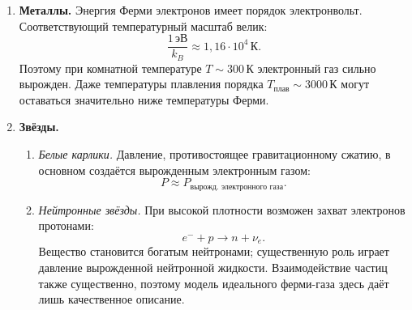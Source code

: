 \documentclass[../final.tex]{subfiles}
\begin{document}
\begin{enumerate}
    \item \textbf{Металлы.}
    Энергия Ферми электронов имеет порядок электронвольт.
    Соответствующий температурный масштаб велик:
    \begin{equation*}
        \frac{1\,\text{эВ}}{k_B}
        \approx 1{,}16\cdot 10^4\,\text{К}.
    \end{equation*}
    Поэтому при комнатной температуре $T\sim 300\,\text{К}$
    электронный газ сильно вырожден. Даже температуры плавления
    порядка $T_{\text{плав}}\sim 3000\,\text{К}$ могут оставаться
    значительно ниже температуры Ферми.

    \item \textbf{Звёзды.}
    \begin{enumerate}
        \item \textit{Белые карлики.}
        Давление, противостоящее гравитационному сжатию,
        в основном создаётся вырожденным электронным газом:
        \begin{equation*}
            P \approx P_{\text{вырожд. электронного газа}}.
        \end{equation*}

        \item \textit{Нейтронные звёзды.}
        При высокой плотности возможен захват электронов протонами:
        \begin{equation*}
            e^- + p \longrightarrow n + \nu_e.
        \end{equation*}
        Вещество становится богатым нейтронами; существенную роль
        играет давление вырожденной нейтронной жидкости.
        Взаимодействие частиц также существенно, поэтому модель
        идеального ферми-газа здесь даёт лишь качественное описание.
    \end{enumerate}
\end{enumerate}
\end{document}
